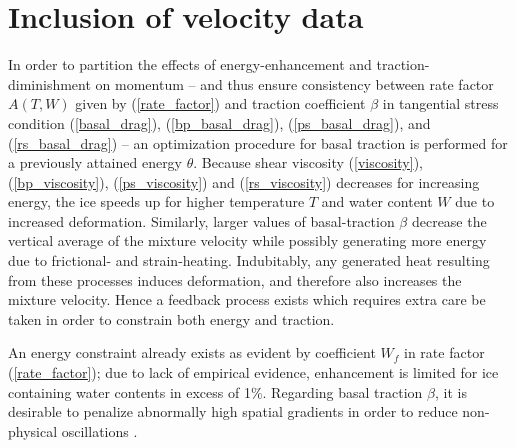
\chapter{Inclusion of velocity data} \label{ssn_inclusion_of_velocity_data}

In order to partition the effects of energy-enhancement and traction-diminishment on momentum -- and thus ensure consistency between rate factor $A(T,W)$ given by (\ref{rate_factor}) and traction coefficient $\beta$ in tangential stress condition (\ref{basal_drag}), (\ref{bp_basal_drag}), (\ref{ps_basal_drag}), and (\ref{rs_basal_drag}) -- an optimization procedure for basal traction is performed for a previously attained energy $\theta$.  Because shear viscosity (\ref{viscosity}), (\ref{bp_viscosity}), (\ref{ps_viscosity}) and (\ref{rs_viscosity}) decreases for increasing energy, the ice speeds up for higher temperature $T$ and water content $W$ due to increased deformation.  Similarly, larger values of basal-traction $\beta$ decrease the vertical average of the mixture velocity while possibly generating more energy due to frictional- and strain-heating.  Indubitably, any generated heat resulting from these processes induces deformation, and therefore also increases the mixture velocity.  Hence a feedback process exists which requires extra care be taken in order to constrain both energy and traction.

An energy constraint already exists as evident by coefficient $W_f$ in rate factor (\ref{rate_factor}); due to lack of empirical evidence, enhancement is limited for ice containing water contents in excess of 1\%.  Regarding basal traction $\beta$, it is desirable to penalize abnormally high spatial gradients in order to reduce non-physical oscillations \citep{vogel_2002}.

